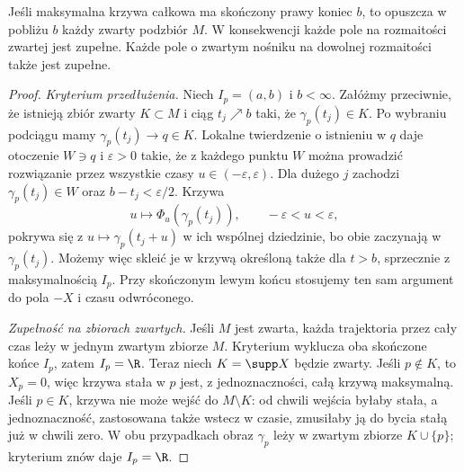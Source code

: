 \begin{twierdzenie}
\label{thm:zupelnosc}
Jeśli maksymalna krzywa całkowa ma skończony prawy koniec $b$, to
opuszcza w pobliżu $b$ każdy zwarty podzbiór $M$.
W konsekwencji każde pole na rozmaitości zwartej jest zupełne.
Każde pole o zwartym nośniku na dowolnej rozmaitości także jest zupełne.
\end{twierdzenie}
\begin{proof}
\emph{Kryterium przedłużenia.}
Niech $I_p=(a,b)$ i $b<\infty$. Załóżmy przeciwnie,
że istnieją zbiór zwarty $K\subset M$ i ciąg
$t_j\nearrow b$ taki, że $\gamma_p(t_j)\in K$.
Po wybraniu podciągu mamy $\gamma_p(t_j)\to q\in K$.
Lokalne twierdzenie o istnieniu w $q$ daje otoczenie
$W\ni q$ i $\varepsilon>0$ takie, że z każdego punktu
$W$ można prowadzić rozwiązanie przez wszystkie czasy
$u\in(-\varepsilon,\varepsilon)$.
Dla dużego $j$ zachodzi $\gamma_p(t_j)\in W$
oraz $b-t_j<\varepsilon/2$.
Krzywa
\[
 u\longmapsto\Phi_u(\gamma_p(t_j)),\qquad
 -\varepsilon<u<\varepsilon,
\]
pokrywa się z $u\mapsto\gamma_p(t_j+u)$ w ich wspólnej
dziedzinie, bo obie zaczynają w $\gamma_p(t_j)$.
Możemy więc skleić je w krzywą określoną także dla
$t> b$, sprzecznie z maksymalnością $I_p$.
Przy skończonym lewym końcu stosujemy ten sam argument
do pola $-X$ i czasu odwróconego.

\emph{Zupełność na zbiorach zwartych.}
Jeśli $M$ jest zwarta, każda trajektoria przez cały czas
leży w jednym zwartym zbiorze $M$. Kryterium wyklucza
oba skończone końce $I_p$, zatem $I_p=\R$.
Teraz niech $K=\supp X$ będzie zwarty.
Jeśli $p\notin K$, to $X_p=0$, więc krzywa
stała w $p$ jest, z jednoznaczności, całą krzywą
maksymalną. Jeśli $p\in K$, krzywa nie może wejść
do $M\setminus K$: od chwili wejścia byłaby stała,
a jednoznaczność, zastosowana także wstecz w czasie,
zmusiłaby ją do bycia stałą już w chwili zero.
W obu przypadkach obraz $\gamma_p$ leży w zwartym
zbiorze $K\cup\{p\}$; kryterium znów daje $I_p=\R$.
\end{proof}

